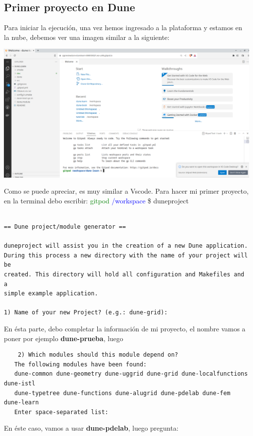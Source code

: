 \subsection[Primer Proyecto]{Primer proyecto en Dune}

Para iniciar la ejecución, una vez hemos ingresado a la plataforma y
estamos en la nube, debemos ver una imagen similar a la siguiente:

\begin{center}\label{fig:ingreso}
	\includegraphics[scale=0.3]{PantallaIngreso.png}
\end{center}
Como se puede apreciar, es muy similar a Vscode.  Para hacer mi primer proyecto, en la terminal debo escribir:
\textcolor{green}{gitpod} \textcolor{blue}{/workspace} \$ duneproject
\begin{verbatim}

== Dune project/module generator ==

duneproject will assist you in the creation of a new Dune application.
During this process a new directory with the name of your project will be
created. This directory will hold all configuration and Makefiles and a
simple example application.

1) Name of your new Project? (e.g.: dune-grid): 
\end{verbatim}
En ésta parte, debo completar la información de mi proyecto, el nombre vamos a poner por ejemplo \textbf{dune-prueba}, luego
\begin{verbatim}
	2) Which modules should this module depend on?
   The following modules have been found:
   dune-common dune-geometry dune-uggrid dune-grid dune-localfunctions dune-istl 
   dune-typetree dune-functions dune-alugrid dune-pdelab dune-fem dune-learn 
   Enter space-separated list:
\end{verbatim}
En éste caso, vamos a usar \textbf{dune-pdelab}, luego pregunta:
